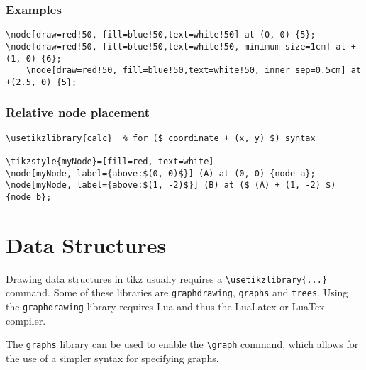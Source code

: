 \documentclass{article}
\begin{document}
\subsubsection*{Examples}

\begin{verbatim}\node[draw=red!50, fill=blue!50,text=white!50] at (0, 0) {5};
\node[draw=red!50, fill=blue!50,text=white!50, minimum size=1cm] at +(1, 0) {6};
	\node[draw=red!50, fill=blue!50,text=white!50, inner sep=0.5cm] at +(2.5, 0) {5};
\end{verbatim}

\subsubsection*{Relative node placement}
\begin{verbatim}
\usetikzlibrary{calc}  % for ($ coordinate + (x, y) $) syntax

\tikzstyle{myNode}=[fill=red, text=white]
\node[myNode, label={above:$(0, 0)$}] (A) at (0, 0) {node a};
\node[myNode, label={above:$(1, -2)$}] (B) at ($ (A) + (1, -2) $) {node b};
\end{verbatim}


\section*{Data Structures}
Drawing data structures in tikz usually requires a \verb|\usetikzlibrary{...}| command. 
Some of these libraries are \texttt{graphdrawing}, \texttt{graphs} and \texttt{trees}. 
Using the \texttt{graphdrawing} library requires Lua and thus the LuaLatex 
or LuaTex compiler.

The \texttt{graphs} library can be used to enable the \verb|\graph| command, 
which allows for the use of a simpler syntax for specifying graphs. 
\end{document}
